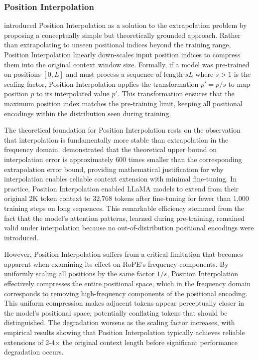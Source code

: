 \subsubsection{Position Interpolation}

\citet{chen2023extending} introduced Position Interpolation as a solution to the extrapolation problem by proposing a conceptually simple but theoretically grounded approach. Rather than extrapolating to unseen positional indices beyond the training range, Position Interpolation linearly down-scales input position indices to compress them into the original context window size. Formally, if a model was pre-trained on positions $[0, L]$ and must process a sequence of length $sL$ where $s > 1$ is the scaling factor, Position Interpolation applies the transformation $p' = p/s$ to map position $p$ to its interpolated value $p'$. This transformation ensures that the maximum position index matches the pre-training limit, keeping all positional encodings within the distribution seen during training.

The theoretical foundation for Position Interpolation rests on the observation that interpolation is fundamentally more stable than extrapolation in the frequency domain. \citet{chen2023extending} demonstrated that the theoretical upper bound on interpolation error is approximately 600 times smaller than the corresponding extrapolation error bound, providing mathematical justification for why interpolation enables reliable context extension with minimal fine-tuning. In practice, Position Interpolation enabled LLaMA models to extend from their original 2K token context to 32,768 tokens after fine-tuning for fewer than 1,000 training steps on long sequences. This remarkable efficiency stemmed from the fact that the model's attention patterns, learned during pre-training, remained valid under interpolation because no out-of-distribution positional encodings were introduced.

However, Position Interpolation suffers from a critical limitation that becomes apparent when examining its effect on RoPE's frequency components. By uniformly scaling all positions by the same factor $1/s$, Position Interpolation effectively compresses the entire positional space, which in the frequency domain corresponds to removing high-frequency components of the positional encoding. This uniform compression makes adjacent tokens appear perceptually closer in the model's positional space, potentially conflating tokens that should be distinguished. The degradation worsens as the scaling factor increases, with empirical results showing that Position Interpolation typically achieves reliable extensions of 2-4$\times$ the original context length before significant performance degradation occurs.

